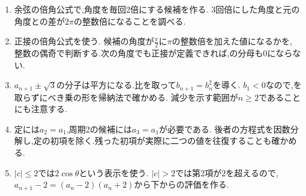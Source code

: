 \begin{enumerate}[label=\textbf{問\arabic*.},leftmargin=3.8em,format=\bookitemlink{practice-special}{hint}{problem}]
                初項を$\displaystyle 2+2^{-1}$と表し,指数を毎回3倍にする候補を作る.
          \item 余弦の倍角公式で,角度を毎回2倍にする候補を作る.
                3回倍にした角度と元の角度との差が$\displaystyle 2\pi$の整数倍になることを調べる.
          \item 正接の倍角公式を使う.
                候補の角度が$\displaystyle \frac{\pi}{2}$に$\displaystyle \pi$の整数倍を加えた値になるかを,
                整数の偶奇で判断する.次の角度でも正接が定義できれば,の分母も$\displaystyle 0$にならない.
          \item $\displaystyle a_{n+1}\pm\sqrt3$の分子は平方になる.比を取って$\displaystyle b_{n+1}=b_n^2$を導く.
                $\displaystyle b_1<0$なので,を取らずにべき乗の形を帰納法で確かめる.
                減少を示す範囲が$\displaystyle n\ge2$であることにも注意する.
          \item 定には$\displaystyle a_2=a_1$,周期2の候補には$\displaystyle a_3=a_1$が必要である.
                後者の方程式を因数分解し,定の初項を除く.残った初項が実際に二つの値を往復することも確かめる.
          \item $\displaystyle |c|\le2$では$\displaystyle 2\cos\theta$という表示を使う.
                $\displaystyle |c|>2$では第2項が$\displaystyle 2$を超えるので,
                $\displaystyle a_{n+1}-2=(a_n-2)(a_n+2)$から下からの評価を作る.
        \end{enumerate}

